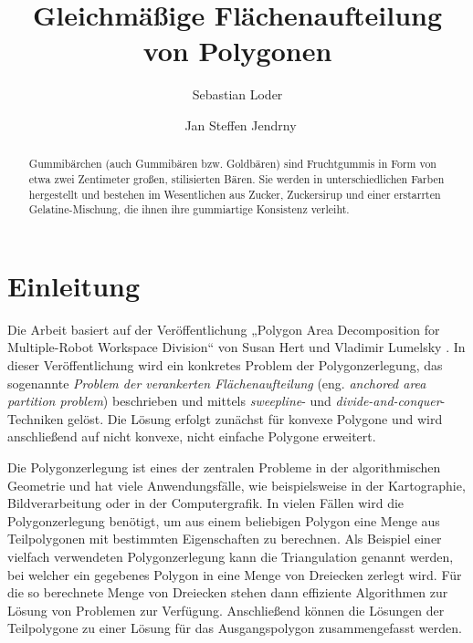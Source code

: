 \documentclass[ngerman]{seminarbeitrag}
\begin{document}
\title{Gleichmäßige Flächenaufteilung von Polygonen}
\author{Sebastian Loder\and\ Jan Steffen Jendrny}

\maketitle%

\begin{abstract}
Gummibärchen (auch Gummibären bzw. Goldbären) sind Fruchtgummis in Form von etwa
zwei Zentimeter großen, stilisierten Bären. Sie werden in unterschiedlichen Farben hergestellt
und bestehen im Wesentlichen aus Zucker, Zuckersirup und einer erstarrten
Gelatine-Mischung, die ihnen ihre gummiartige Konsistenz verleiht.

\end{abstract}

\section{Einleitung}\label{einleitung}
Die Arbeit basiert auf der Veröffentlichung „Polygon Area Decomposition for Multiple-Robot Workspace Division“ von Susan Hert und Vladimir Lumelsky \cite{Hert.1998}.
In dieser Veröffentlichung wird ein konkretes Problem der Polygonzerlegung, das sogenannte \emph{Problem der verankerten Flächenaufteilung} (eng. \emph{anchored
area partition problem}) beschrieben und mittels \emph{sweepline}- und \emph{divide-and-conquer}-Techniken gelöst. Die Lösung erfolgt zunächst für konvexe Polygone und wird
anschließend auf nicht konvexe, nicht einfache Polygone erweitert.

Die Polygonzerlegung ist eines der zentralen Probleme in der algorithmischen Geometrie und hat viele Anwendungsfälle, wie beispielsweise in der Kartographie,
Bildverarbeitung oder in der Computergrafik. In vielen Fällen wird die Polygonzerlegung benötigt, um aus einem beliebigen Polygon eine Menge aus Teilpolygonen mit bestimmten
Eigenschaften zu berechnen. Als Beispiel einer vielfach verwendeten Polygonzerlegung kann die Triangulation genannt werden, bei welcher ein gegebenes Polygon in eine Menge von Dreiecken
zerlegt wird. Für die so berechnete Menge von Dreiecken stehen dann effiziente Algorithmen zur Lösung von Problemen zur Verfügung. Anschließend können die Lösungen der Teilpolygone zu
einer Lösung für das Ausgangspolygon zusammengefasst werden. \\
\end{document}
